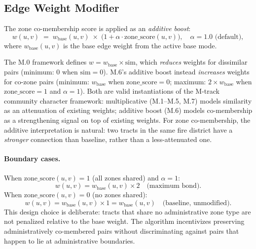 \subsection{Edge Weight Modifier}

The zone co-membership score is applied as an \emph{additive boost}:
\begin{equation}
  w(u,v)
  \;=\;
  w_{\mathrm{base}}(u,v) \;\times\; \bigl(1 + \alpha \cdot \mathrm{zone\_score}(u,v)\bigr),
  \quad \alpha = 1.0 \text{ (default)},
  \label{eq:zone-weight}
\end{equation}
where $w_{\mathrm{base}}(u,v)$ is the base edge weight from the active base mode.

\begin{remark}
The M.0 framework defines $w = w_{\mathrm{base}} \times \mathrm{sim}$, which \emph{reduces}
weights for dissimilar pairs (minimum: $0$ when $\mathrm{sim}=0$).
M.6's additive boost instead \emph{increases} weights for co-zone pairs
(minimum: $w_{\mathrm{base}}$ when $\mathrm{zone\_score}=0$; maximum: $2 \times w_{\mathrm{base}}$
when $\mathrm{zone\_score}=1$ and $\alpha=1$).
Both are valid instantiations of the M-track community character framework:
multiplicative (M.1--M.5, M.7) models similarity as an attenuation of existing weights;
additive boost (M.6) models co-membership as a strengthening signal on top of
existing weights. For zone co-membership, the additive interpretation is natural:
two tracts in the same fire district have a \emph{stronger} connection than baseline,
rather than a less-attenuated one.
\end{remark}

\paragraph{Boundary cases.}
When $\mathrm{zone\_score}(u,v) = 1$ (all zones shared) and $\alpha = 1$:
\begin{equation}
  w(u,v) = w_{\mathrm{base}}(u,v) \times 2 \quad \text{(maximum bond)}.
\end{equation}
When $\mathrm{zone\_score}(u,v) = 0$ (no zones shared):
\begin{equation}
  w(u,v) = w_{\mathrm{base}}(u,v) \times 1 = w_{\mathrm{base}}(u,v) \quad \text{(baseline, unmodified)}.
\end{equation}
This design choice is deliberate: tracts that share no administrative zone type
are not penalized relative to the base weight.
The algorithm incentivizes preserving administratively co-membered pairs without
discriminating against pairs that happen to lie at administrative boundaries.

